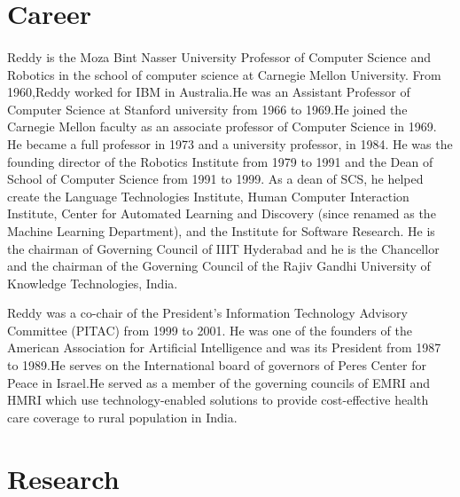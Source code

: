 \documentclass[a4paper,10pt]{article}
\begin{document}
\section{Career}
\paragraph{}
  Reddy is the Moza Bint Nasser University Professor of Computer Science and
  Robotics in the school of computer science at Carnegie Mellon University.
  From 1960,Reddy worked for IBM in Australia.He was an Assistant Professor
  of Computer Science at Stanford university from 1966 to 1969.He joined 
  the Carnegie Mellon faculty as an associate professor of Computer Science in
  1969. He became a full professor in 1973 and a university professor, in 1984.
  He was the founding director of the Robotics Institute from 1979 to 1991 
  and the Dean of School of Computer Science from 1991 to 1999. As a dean of 
  SCS, he helped create the Language Technologies Institute, Human Computer 
  Interaction Institute, Center for Automated Learning and Discovery (since 
  renamed as the Machine Learning Department), and the Institute for Software
  Research. He is the chairman of Governing Council of IIIT Hyderabad and he 
  is the Chancellor and the chairman of the Governing Council of the Rajiv 
  Gandhi University of Knowledge Technologies, India.
  
  Reddy was a co-chair of the President's Information Technology Advisory 
  Committee (PITAC) from 1999 to 2001. He was one of the founders of the 
  American Association for Artificial Intelligence and was its President
  from 1987 to 1989.He serves on the International board of governors of 
  Peres Center for Peace in Israel.He served as a member of the governing 
  councils of EMRI and HMRI which use technology-enabled solutions to provide
  cost-effective health care coverage to rural population in India.
  
\section{Research}
\end{document}
